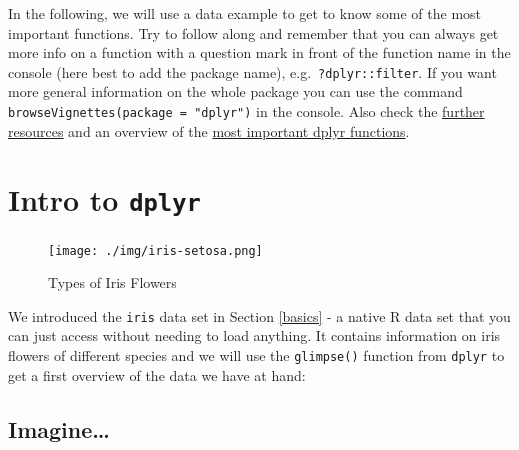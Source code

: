 \documentclass[
]{book}
\newenvironment{Shaded}{\begin{snugshade}}{\end{snugshade}}
\newcommand{\CommentTok}[1]{\textcolor[rgb]{0.56,0.35,0.01}{\textit{#1}}}
\newcommand{\FunctionTok}[1]{\textcolor[rgb]{0.13,0.29,0.53}{\textbf{#1}}}
\newcommand{\NormalTok}[1]{#1}
\newcommand{\SpecialCharTok}[1]{\textcolor[rgb]{0.81,0.36,0.00}{\textbf{#1}}}
\begin{document}
In the following, we will use a data example to get to know some of the most important functions.
Try to follow along and remember that you can always get more info on a function with a question mark in front of the function name in the console (here best to add the package name), e.g.~\texttt{?dplyr::filter}.
If you want more general information on the whole package you can use the command \texttt{browseVignettes(package\ =\ "dplyr")} in the console.
Also check the \hyperref[wrapupdplyr]{further resources} and an overview of the \hyperref[mif]{most important dplyr functions}.

\section{\texorpdfstring{Intro to \texttt{dplyr}}{Intro to dplyr}}\label{intro-iris}

\begin{figure}
\centering
\texttt{[image: ./img/iris-setosa.png]}
\caption{Types of Iris Flowers}
\end{figure}

We introduced the \texttt{iris} data set in Section \ref{basics} - a native R data set that you can just access without needing to load anything.
It contains information on iris flowers of different species and we will use the \texttt{glimpse()} function from \texttt{dplyr} to get a first overview of the data we have at hand:

\begin{Shaded}
\end{Shaded}

\subsection*{Imagine\ldots{}}\label{imagine}
\end{document}
